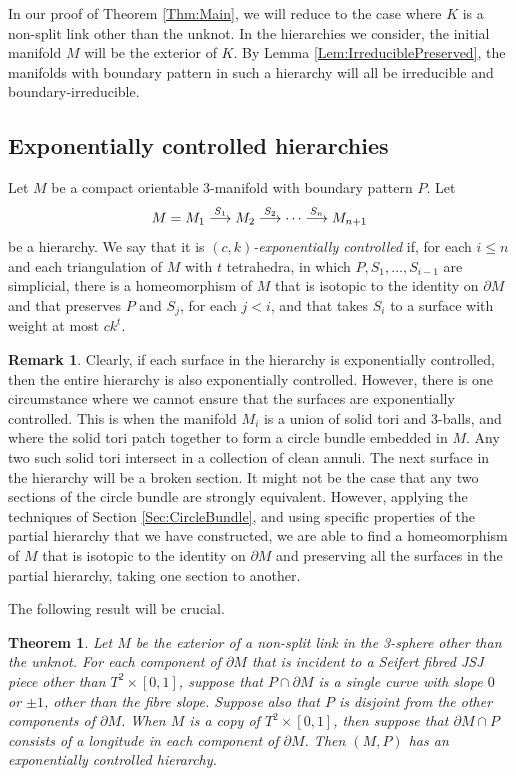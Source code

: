 \documentclass[oneside]{amsart}
\numberwithin{equation}{section}
\theoremstyle{plain}
\newtheorem{theorem}[equation]{Theorem}
\theoremstyle{definition}
\newtheorem{remark}[equation]{Remark}
\begin{document}
In our proof of Theorem \ref{Thm:Main}, we will reduce to the case where $K$ is a non-split link other than the unknot.
In the hierarchies we consider, the initial manifold $M$ will be the exterior of $K$. By Lemma \ref{Lem:IrreduciblePreserved},
the manifolds with boundary pattern in such a hierarchy will all be irreducible and boundary-irreducible.

\subsection{Exponentially controlled hierarchies}
Let $M$ be a compact orientable 3-manifold with boundary pattern $P$.
Let
$$M = M_1 \buildrel S_1 \over \longrightarrow M_2 \buildrel S_2 \over \longrightarrow \dots
\buildrel S_{n} \over \longrightarrow M_{n+1}$$
be a hierarchy. We say that it is \emph{$(c,k)$-exponentially controlled} if, for each $i \leq n$
and each triangulation of $M$ with $t$ tetrahedra, in which $P, S_1, \dots, S_{i-1}$
are simplicial, there is a homeomorphism of $M$ that is isotopic
to the identity on $\partial M$ and that preserves $P$ and $S_j$, for each $j < i$, and that takes
$S_i$ to a surface with weight at most $ck^t$.

\begin{remark}
Clearly, if each surface in the hierarchy is exponentially controlled, then the entire hierarchy is
also exponentially controlled. However, there is one circumstance where we cannot ensure
that the surfaces are exponentially controlled. This is when the manifold $M_i$ is a union of solid
tori and 3-balls, and where the solid tori patch together to form a circle bundle embedded
in $M$. Any two such solid tori intersect in a collection of clean annuli. The next surface in
the hierarchy will be a broken section. It might not be the case that any two sections
of the circle bundle are strongly equivalent. However, applying the techniques
of Section \ref{Sec:CircleBundle}, and using specific properties of the partial hierarchy that we have
constructed, we are able to find a homeomorphism of $M$ that is isotopic
to the identity on $\partial M$ and preserving all the surfaces in the partial hierarchy,
taking one section to another.
\end{remark}

The following result will be crucial.

\begin{theorem}
\label{Thm:WeaklyFundamentalHierarchy}
Let $M$ be the exterior of a non-split link in the 3-sphere other than the unknot.
For each component of $\partial M$ that is incident to a Seifert fibred JSJ piece other than $T^2 \times [0,1]$,
suppose that $P \cap \partial M$ is a single curve with slope $0$ or $\pm 1$, other than
the fibre slope. Suppose also that $P$ is disjoint from the other components of $\partial M$.
When $M$ is a copy of $T^2 \times [0,1]$, then suppose that $\partial M \cap P$
consists of a longitude in each component of $\partial M$.
Then $(M,P)$ has an exponentially controlled hierarchy.
\end{theorem}
\end{document}
